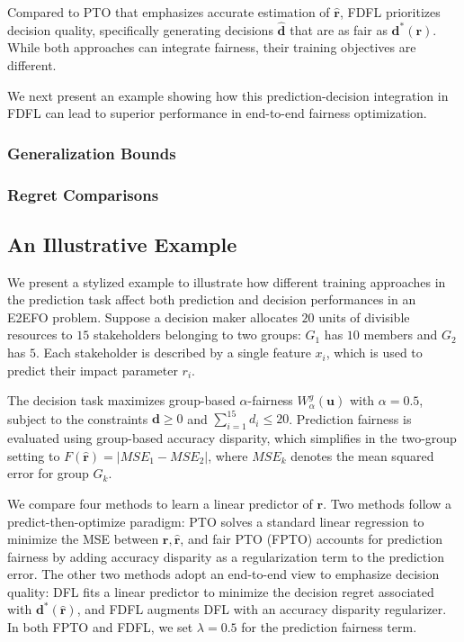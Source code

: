 \documentclass[ijoc,sglanonrev]{informs4}
\begin{document}
Compared to PTO that emphasizes accurate estimation of $\hat{\mathbf{r}}$, FDFL prioritizes decision quality, specifically generating decisions $\hat{\mathbf{d}}$ that are as fair as $\mathbf{d^*}(\mathbf{r})$. While both approaches can integrate fairness, their training objectives are different. 

We next present an example showing how this prediction-decision integration in FDFL can lead to superior performance in end-to-end fairness optimization.


\subsubsection{Generalization Bounds}

\subsubsection{Regret Comparisons}


\subsection{An Illustrative Example} \label{sec:example}
We present a stylized example to illustrate how different training approaches in the prediction task affect both prediction and decision performances in an E2EFO problem. Suppose a decision maker allocates $20$ units of divisible resources to $15$ stakeholders belonging to two groups: $G_1$ has $10$ members and $G_2$ has $5$. Each stakeholder is described by a single feature $x_i$, which is used to predict their impact parameter $r_i$. 

The decision task maximizes group-based $\alpha$-fairness $W^g_{\alpha}(\mathbf{u})$ with $\alpha = 0.5$, subject to the constraints $\mathbf{d} \geq 0$ and $\sum_{i=1}^{15} d_i \leq 20$. Prediction fairness is evaluated using group-based accuracy disparity, which simplifies in the two-group setting to $F(\hat{\mathbf{r}}) = |MSE_1 - MSE_2|$, where $MSE_k$ denotes the mean squared error for group $G_k$.

We compare four methods to learn a linear predictor of $\mathbf{r}$. Two methods follow a predict-then-optimize paradigm: PTO solves a standard linear regression to minimize the MSE between $\mathbf{r}, \hat{\mathbf{r}}$, and fair PTO (FPTO) accounts for prediction fairness by adding accuracy disparity as a regularization term to the prediction error. The other two methods adopt an end-to-end view to emphasize decision quality: DFL fits a linear predictor to minimize the decision regret associated with $\mathbf{d}^*(\hat{\mathbf{r}})$, and FDFL augments DFL with an accuracy disparity regularizer. In both FPTO and FDFL, we set $\lambda = 0.5$ for the prediction fairness term. 
\end{document}
